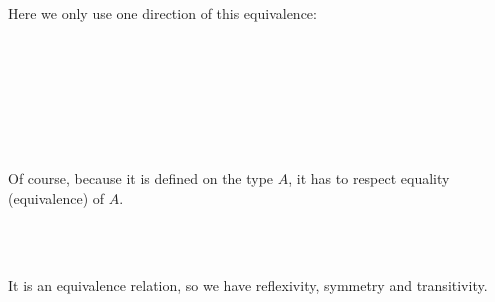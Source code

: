 Here we only use one direction of this equivalence:

\begin{code}
%
\\
\>[0]\<[9]%
\>[9] \AgdaSymbol{:}   \AgdaSymbol{:}   \AgdaSymbol{\}}\<%
\\
\>[9]\<[19]%
\>[19]\AgdaSymbol{(} \AgdaSymbol{:} \AgdaFunction{[}  \AgdaFunction{]}   \AgdaSymbol{)}\<%
\\
\>[9]\<[19]%
\>[19]\AgdaSymbol{(}  \AgdaSymbol{:}  \AgdaFunction{[}  \AgdaFunction{]fm}  \AgdaSymbol{)} \<%
\\
\>[9]\<[19]%
\>[19]   \AgdaSymbol{)}  \<[32]%
\>[32]\<%
\\
\>[9]\<[19]%
\>[19]  \AgdaSymbol{(}\AgdaFunction{[}  \AgdaFunction{]subst}  \AgdaSymbol{)} \AgdaSymbol{(}\AgdaFunction{[}  \AgdaFunction{]subst}  \AgdaSymbol{))}\<%
\\
\end{code}

Of course, because it is defined on the type $A$, it has to respect equality (equivalence) of $A$.

\begin{code}
%
\\
\>[0]\<[9]%
\>[9] \AgdaSymbol{:}  \AgdaSymbol{\{}  \AgdaSymbol{\}}  \AgdaFunction{[} \AgdaFunction{[}  \AgdaFunction{]fm}  \AgdaFunction{]}   \AgdaSymbol{)}     \AgdaSymbol{)}\<%
\\
\end{code}

It is an equivalence relation, so we have reflexivity, symmetry and transitivity.

